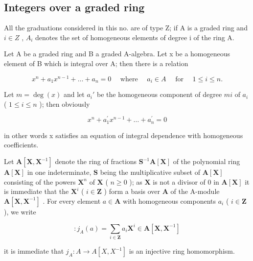 \subsection{Integers over a graded ring}

All the graduations considered in this no. are of type Z; if A is a graded ring and \(i \in Z\) , \(A_{i}\) denotes the set of homogeneous elements of degree i of the ring A.

Let A be a graded ring and B a graded A-algebra. Let x be a homogeneous element of B which is integral over A; then there is a relation

\[
x ^ {n} + a _ {1} x ^ {n - 1} + \dots + a _ {n} = 0 \quad \text { where } \quad a _ {i} \in A \quad \text { for } \quad 1 \leqslant i \leqslant n.\tag{3}
\]

Let \(m = \deg(x)\) and let \(a_i'\) be the homogeneous component of degree \(mi\) of \(a_i\) ( \(1 \leqslant i \leqslant n\) ); then obviously

\[
x ^ {n} + a _ {1} ^ {\prime} x ^ {n - 1} + \dots + a _ {n} ^ {\prime} = 0\tag{4}
\]

in other words x satisfies an equation of integral dependence with homogeneous coefficients.

Let \(\mathbf{A}[\mathbf{X},\mathbf{X}^{-1}]\) denote the ring of fractions \(\mathbf{S}^{-1}\mathbf{A}[\mathbf{X}]\) of the polynomial ring \(\mathbf{A}[\mathbf{X}]\) in one indeterminate, \(\mathbf{S}\) being the multiplicative subset of \(\mathbf{A}[\mathbf{X}]\) consisting of the powers \(\mathbf{X}^n\) of \(\mathbf{X}\) ( \(n\geqslant 0\) ); as \(\mathbf{X}\) is not a divisor of 0 in \(\mathbf{A}[\mathbf{X}]\) it is immediate that the \(\mathbf{X}^i\) ( \(i\in \mathbf{Z}\) ) form a basis over \(\mathbf{A}\) of the A-module \(\mathbf{A}[\mathbf{X},\mathbf{X}^{-1}]\) . For every element \(a\in \mathbf{A}\) with homogeneous components \(a_{i}\) ( \(i\in \mathbf{Z}\) ), we write

\[
:j_{A}(a) = \sum_{i \in \mathbf{Z}} a_{i} \mathbf{X}^{i} \in \mathbf{A}[\mathbf{X},\mathbf{X}^{-1}]\tag{5}
\]

it is immediate that \(j_{A}: A \to A[X, X^{-1}]\) is an injective ring homomorphism.

